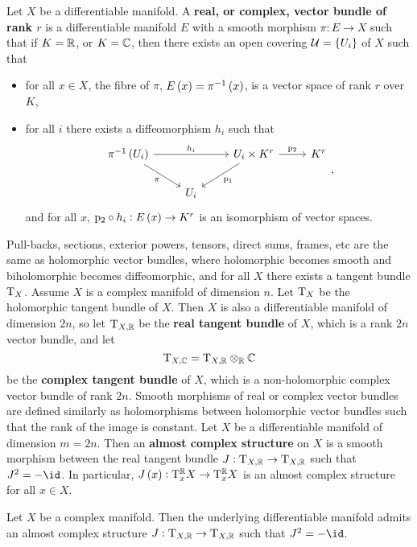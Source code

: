 \begin{definition}
Let $ X $ be a differentiable manifold. A \textbf{real, or complex, vector bundle of rank $ r $} is a differentiable manifold $ E $ with a smooth morphism $ \pi : E \to X $ such that if $ K = \mathbb{R} $, or $ K = \mathbb{C} $, then there exists an open covering $ \UUU = \cbr{U_i} $ of $ X $ such that
\begin{itemize}
\item for all $ x \in X $, the fibre of $ \pi $, $ E\br{x} = \pi^{-1}\br{x} $, is a vector space of rank $ r $ over $ K $,
\item for all $ i $ there exists a diffeomorphism $ h_i $ such that
$$
\begin{tikzcd}
\pi^{-1}\br{U_i} \arrow{rr}{h_i} \arrow{dr}[swap]{\pi} & & U_i \times K^r \arrow{r}{\p_2} \arrow{dl}{\p_1} & K^r \\
& U_i & &
\end{tikzcd},
$$
and for all $ x $, $ \p_2 \circ h_i : E\br{x} \to K^r $ is an isomorphism of vector spaces.
\end{itemize}
\end{definition}

Pull-backs, sections, exterior powers, tensors, direct sums, frames, etc are the same as holomorphic vector bundles, where holomorphic becomes smooth and biholomorphic becomes diffeomorphic, and for all $ X $ there exists a tangent bundle $ \mathrm{T}_X $. Assume $ X $ is a complex manifold of dimension $ n $. Let $ \mathrm{T}_X $ be the holomorphic tangent bundle of $ X $. Then $ X $ is also a differentiable manifold of dimension $ 2n $, so let $ \mathrm{T}_{X, \mathbb{R}} $ be the \textbf{real tangent bundle} of $ X $, which is a rank $ 2n $ vector bundle, and let
$$ \mathrm{T}_{X, \mathbb{C}} = \mathrm{T}_{X, \mathbb{R}} \otimes_{\mathbb{R}} \mathbb{C} $$
be the \textbf{complex tangent bundle} of $ X $, which is a non-holomorphic complex vector bundle of rank $ 2n $. Smooth morphisms of real or complex vector bundles are defined similarly as holomorphisms between holomorphic vector bundles such that the rank of the image is constant. Let $ X $ be a differentiable manifold of dimension $ m = 2n $. Then an \textbf{almost complex structure} on $ X $ is a smooth morphism between the real tangent bundle $ J : \mathrm{T}_{X, \mathbb{R}} \to \mathrm{T}_{X, \mathbb{R}} $ such that $ J^2 = -\id $. In particular, $ J\br{x} : \T_x^\RR X \to \T_x^\RR X $ is an almost complex structure for all $ x \in X $.


\begin{proposition}
Let $ X $ be a complex manifold. Then the underlying differentiable manifold admits an almost complex structure $ J : \mathrm{T}_{X, \mathbb{R}} \to \mathrm{T}_{X, \mathbb{R}} $ such that $ J^2 = -\id $.
\end{proposition}

